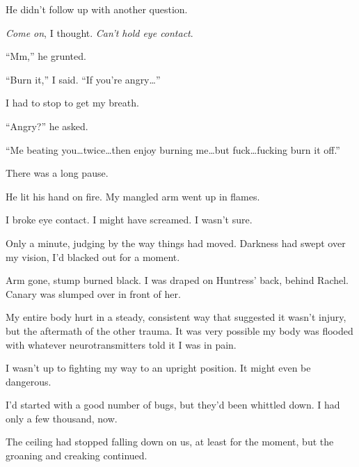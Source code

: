 He didn't follow up with another question.



\emph{Come on}, I thought.  \emph{Can't hold eye contact}.



``Mm,'' he grunted.



``Burn it,'' I said.  ``If you're angry\ldots''



I had to stop to get my breath.



``Angry?'' he asked.



``Me beating you\ldots twice\ldots then enjoy burning me\ldots but fuck\ldots fucking burn it off.''



There was a long pause.



He lit his hand on fire.  My mangled arm went up in flames.



I broke eye contact.  I might have screamed.  I wasn't sure.



\sectionbreak



Only a minute, judging by the way things had moved.  Darkness had swept over my vision, I'd blacked out for a moment.



Arm gone, stump burned black.  I was draped on Huntress' back, behind Rachel.  Canary was slumped over in front of her.



My entire body hurt in a steady, consistent way that suggested it wasn't injury, but the aftermath of the other trauma.  It was very possible my body was flooded with whatever neurotransmitters told it I was in pain.



I wasn't up to fighting my way to an upright position.  It might even be dangerous.



I'd started with a good number of bugs, but they'd been whittled down.  I had only a few thousand, now.



The ceiling had stopped falling down on us, at least for the moment, but the groaning and creaking continued.



